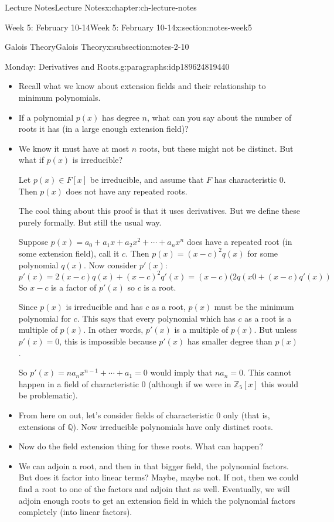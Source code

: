 \documentclass[oneside,11pt,]{book}
\begin{document}
\begin{chapterptx}{Lecture Notes}{}{Lecture Notes}{}{}{x:chapter:ch-lecture-notes}
\begin{sectionptx}{Week 5: February 10-14}{}{Week 5: February 10-14}{}{}{x:section:notes-week5}
\begin{subsectionptx}{Galois Theory}{}{Galois Theory}{}{}{x:subsection:notes-2-10}
\begin{paragraphs}{Monday: Derivatives and Roots.}{g:paragraphs:idp189624819440}
%
\begin{itemize}[label=\textbullet]
\item{}Recall what we know about extension fields and their relationship to minimum polynomials.%
\item{}If a polynomial \(p(x)\) has degree \(n\), what can you say about the number of roots it has (in a large enough extension field)?%
\item{}We know it must have at most \(n\) roots, but these might not be distinct. But what if \(p(x)\) is irreducible?%
\par
Let \(p(x) \in F[x]\) be irreducible, and assume that \(F\) has characteristic \(0\). Then \(p(x)\) does not have any repeated roots.%
\par
The cool thing about this proof is that it uses derivatives. But we define these purely formally. But still the usual way.%
\par
Suppose \(p(x) = a_0 + a_1x + a_2x^2 + \cdots + a_nx^n\) does have a repeated root (in some extension field), call it \(c\). Then \(p(x) = (x-c)^2q(x)\) for some polynomial \(q(x)\). Now consider \(p'(x)\):%
\begin{equation*}
p'(x) = 2(x-c)q(x) + (x-c)^2q'(x) = (x-c)(2q(x0 + (x-c)q'(x))
\end{equation*}
So \(x-c\) is a factor of \(p'(x)\) so \(c\) is a root.%
\par
Since \(p(x)\) is irreducible and has \(c\) as a root, \(p(x)\) must be the minimum polynomial for \(c\). This says that every polynomial which has \(c\) as a root is a multiple of \(p(x)\). In other words, \(p'(x)\) is a multiple of \(p(x)\). But unless \(p'(x) = 0\), this is impossible because \(p'(x)\) has smaller degree than \(p(x)\).%
\par
So \(p'(x) = na_nx^{n-1} + \cdots + a_1 = 0\) would imply that \(na_n = 0\). This cannot happen in a field of characteristic 0 (although if we were in \(\mathbb Z_5[x]\) this would be problematic).%
\item{}From here on out, let’s consider fields of characteristic 0 only (that is, extensions of \(\mathbb Q\)). Now irreducible polynomials have only distinct roots.%
\item{}Now do the field extension thing for these roots. What can happen?%
\item{}We can adjoin a root, and then in that bigger field, the polynomial factors. But does it factor into linear terms? Maybe, maybe not. If not, then we could find a root to one of the factors and adjoin that as well. Eventually, we will adjoin enough roots to get an extension field in which the polynomial factors completely (into linear factors).%

\end{itemize}
\end{paragraphs}
\end{subsectionptx}
\end{sectionptx}
\end{chapterptx}
\end{document}
